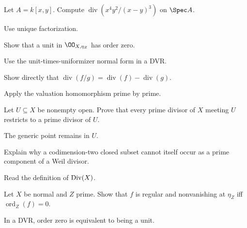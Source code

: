 \fi
\begin{exercise}\label{exr:vi39-07}
Let \(A=k[x,y]\).  Compute \(\operatorname{div}(x^4y^2/(x-y)^3)\) on \(\Spec A\).
\end{exercise}
\ifdefined\IncludeExerciseHints
\begin{hint}
Use unique factorization.
\end{hint}
\fi
\begin{exercise}\label{exr:vi39-08}
Show that a unit in \(\OO_{X,\eta_Z}\) has order zero.
\end{exercise}
\ifdefined\IncludeExerciseHints
\begin{hint}
Use the unit-times-uniformizer normal form in a DVR.
\end{hint}
\fi
\begin{exercise}\label{exr:vi39-09}
Show directly that \(\operatorname{div}(f/g)=\operatorname{div}(f)-\operatorname{div}(g)\).
\end{exercise}
\ifdefined\IncludeExerciseHints
\begin{hint}
Apply the valuation homomorphism prime by prime.
\end{hint}
\fi
\begin{exercise}\label{exr:vi39-10}
Let \(U\subseteq X\) be nonempty open.  Prove that every prime divisor of \(X\) meeting \(U\) restricts to a prime divisor of \(U\).
\end{exercise}
\ifdefined\IncludeExerciseHints
\begin{hint}
The generic point remains in \(U\).
\end{hint}
\fi
\begin{exercise}\label{exr:vi39-11}
Explain why a codimension-two closed subset cannot itself occur as a prime component of a Weil divisor.
\end{exercise}
\ifdefined\IncludeExerciseHints
\begin{hint}
Read the definition of \(\operatorname{Div}(X)\).
\end{hint}
\fi
\begin{exercise}\label{exr:vi39-12}
Let \(X\) be normal and \(Z\) prime.  Show that \(f\) is regular and nonvanishing at \(\eta_Z\) iff \(\operatorname{ord}_Z(f)=0\).
\end{exercise}
\ifdefined\IncludeExerciseHints
\begin{hint}
In a DVR, order zero is equivalent to being a unit.
\end{hint}
